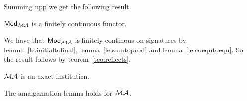 %
Summing upp we get the following result.
\begin{proposition}
${\sf {Mod}}_{{\mathcal{MA}}}$ is a finitely continuous functor.
\end{proposition}
\begin{PROOF}
We have that ${\sf {Mod}}_{{\mathcal{MA}}}$ is finitely continous on signatures by
lemma~\ref{le:initialtofinal}, lemma~\ref{le:sumtoprod} and
lemma~\ref{le:coequtoequ}. So the result follows by teorem~\ref{teo:reflects}.
\end{PROOF}


\begin{corollary}
${\mathcal{MA}}$ is an exact institution.
\end{corollary}


\begin{corollary}
The amalgamation lemma holds for ${\mathcal{MA}}$.
\end{corollary}